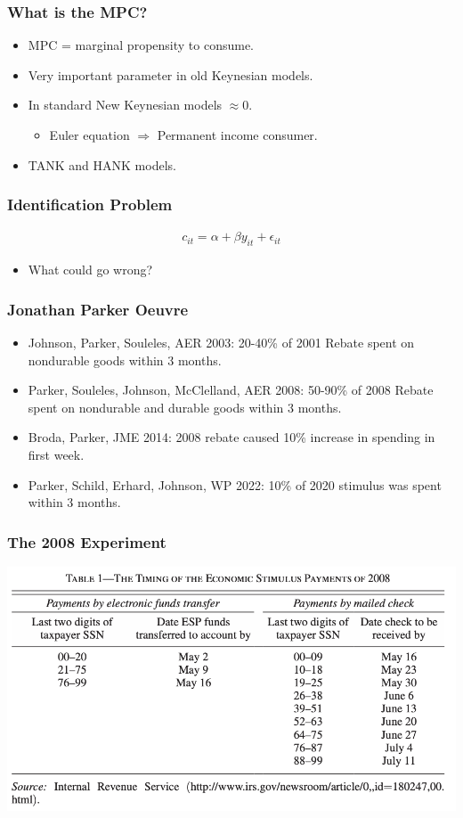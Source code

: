 \documentclass[english,xcolor=svgnames]{beamer}
\begin{document}
\begin{frame}
\frametitle[alignment=center]{What is the MPC?}
\begin{itemize}
	\item MPC = marginal propensity to consume.
	\item Very important parameter in old Keynesian models.
	\item In standard New Keynesian models $\approx 0$.
	\begin{itemize}
		\item Euler equation $\Rightarrow$ Permanent income consumer.
	\end{itemize}
	\item TANK and HANK models.
\end{itemize}
\end{frame}

\begin{frame}
\frametitle[alignment=center]{Identification Problem}
\begin{align*}
	c_{it}  = \alpha + \beta y_{it} + \epsilon_{it}
\end{align*}
\begin{itemize}
	\item What could go wrong?
\end{itemize}
\end{frame}

\begin{frame}
\frametitle[alignment=center]{Jonathan Parker Oeuvre}
\begin{itemize}
	\item Johnson, Parker, Souleles, AER 2003: 20-40\% of 2001 Rebate spent on nondurable goods within 3 months.
	\item Parker, Souleles, Johnson, McClelland, AER 2008: 50-90\% of 2008 Rebate spent on nondurable and durable goods within 3 months.
	\item Broda, Parker, JME 2014: 2008 rebate caused 10\% increase in spending in first week.
	\item Parker, Schild, Erhard, Johnson, WP 2022: 10\% of 2020 stimulus was spent within 3 months.
\end{itemize}
\end{frame}

\begin{frame}
\frametitle[alignment=center]{The 2008 Experiment}
\centering
\includegraphics[scale=0.6]{figures/PSMJTAB1.png}
\end{frame}
\end{document}
